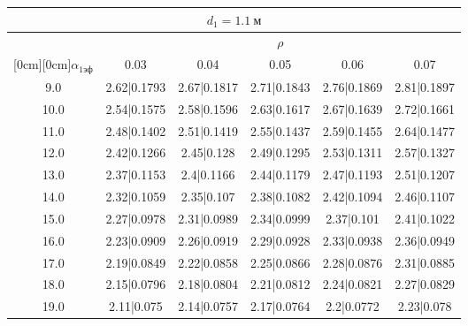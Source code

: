 \documentclass[20pt]{article}
\begin{document}
\begin{center}
\begin{tabular}{c|ccccc}
\hline
	\multicolumn{6}{c}{$d_{1}=1.1 \ м$} \\
\hline
	 & \multicolumn{5}{|c}{$\rho$} \\
	\cline{2-6}
	\raisebox{1.5ex}[0cm][0cm]{$\alpha_{1эф}$} & 0.03 & 0.04 & 0.05 & 0.06 & 0.07\\
\hline
	9.0 & 	2.62|0.1793 & 	2.67|0.1817 & 	2.71|0.1843 & 	2.76|0.1869 & 	2.81|0.1897\\
	10.0 & 	2.54|0.1575 & 	2.58|0.1596 & 	2.63|0.1617 & 	2.67|0.1639 & 	2.72|0.1661\\
	11.0 & 	2.48|0.1402 & 	2.51|0.1419 & 	2.55|0.1437 & 	2.59|0.1455 & 	2.64|0.1477\\
	12.0 & 	2.42|0.1266 & 	2.45|0.128 & 	2.49|0.1295 & 	2.53|0.1311 & 	2.57|0.1327\\
	13.0 & 	2.37|0.1153 & 	2.4|0.1166 & 	2.44|0.1179 & 	2.47|0.1193 & 	2.51|0.1207\\
	14.0 & 	2.32|0.1059 & 	2.35|0.107 & 	2.38|0.1082 & 	2.42|0.1094 & 	2.46|0.1107\\
	15.0 & 	2.27|0.0978 & 	2.31|0.0989 & 	2.34|0.0999 & 	2.37|0.101 & 	2.41|0.1022\\
	16.0 & 	2.23|0.0909 & 	2.26|0.0919 & 	2.29|0.0928 & 	2.33|0.0938 & 	2.36|0.0949\\
	17.0 & 	2.19|0.0849 & 	2.22|0.0858 & 	2.25|0.0866 & 	2.28|0.0876 & 	2.31|0.0885\\
	18.0 & 	2.15|0.0796 & 	2.18|0.0804 & 	2.21|0.0812 & 	2.24|0.0821 & 	2.27|0.0829\\
	19.0 & 	2.11|0.075 & 	2.14|0.0757 & 	2.17|0.0764 & 	2.2|0.0772 & 	2.23|0.078\\
\end{tabular}

\end{center}
\end{document}
